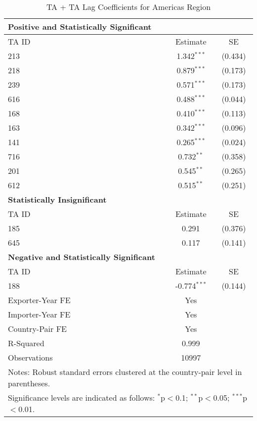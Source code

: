 \begin{table}[htbp]
    \centering
    \caption{TA + TA Lag Coefficients for Americas Region}
    \label{tab:pta_americas}
    \begin{adjustbox}{max width=\textwidth}
    \begin{tabular}{lcc}
    \hline
    \textbf{Positive and Statistically Significant} &  &  \\
    \hline
    TA ID & Estimate & SE \\
    \hline
    213 & 1.342$^{\ast\ast\ast}$ & (0.434) \\
    218 & 0.879$^{\ast\ast\ast}$ & (0.173) \\
    239 & 0.571$^{\ast\ast\ast}$ & (0.173) \\
    616 & 0.488$^{\ast\ast\ast}$ & (0.044) \\
    168 & 0.410$^{\ast\ast\ast}$ & (0.113) \\
    163 & 0.342$^{\ast\ast\ast}$ & (0.096) \\
    141 & 0.265$^{\ast\ast\ast}$ & (0.024) \\
    716 & 0.732$^{\ast\ast}$ & (0.358) \\
    201 & 0.545$^{\ast\ast}$ & (0.265) \\
    612 & 0.515$^{\ast\ast}$ & (0.251) \\
    \hline
    \textbf{Statistically Insignificant} &  &  \\
    \hline
    TA ID & Estimate & SE \\
    \hline
    185 & 0.291 & (0.376) \\
    645 & 0.117 & (0.141) \\
    \hline
    \textbf{Negative and Statistically Significant} &  &  \\
    \hline
    TA ID & Estimate & SE \\
    \hline
    188 & -0.774$^{\ast\ast\ast}$ & (0.144) \\
    \hline
    Exporter-Year FE & Yes \\
    Importer-Year FE & Yes \\
    Country-Pair FE & Yes \\
    R-Squared & 0.999 \\
    Observations & 10997 \\
    \hline
    \multicolumn{3}{l}{\footnotesize{Notes: Robust standard errors clustered at the country-pair level in parentheses.}} \\
    \multicolumn{3}{l}{\footnotesize{Significance levels are indicated as follows: $^{\ast}$p$<$0.1; $^{\ast\ast}$p$<$0.05; $^{\ast\ast\ast}$p$<$0.01.}} \\
    \end{tabular}
    \end{adjustbox}
\end{table}
